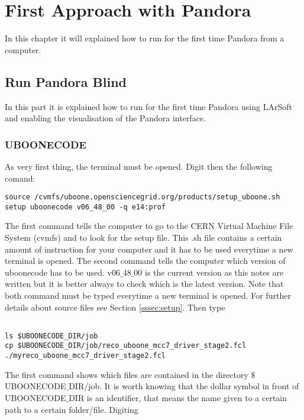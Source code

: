 	\chapter{First Approach with Pandora}

In this chapter it will explained how to run for the first time Pandora from a computer.

	\section{Run Pandora Blind} \label{sssec:pandora_blind}

In this part it is explained how to run for the first time Pandora using LArSoft and enabling the visualisation of the Pandora interface.  

\subsection{UBOONECODE}  \label{sssec:uboonecode}
As very first thing, the terminal must be opened. Digit then the following comand:

\begin{verbatim}
source /cvmfs/uboone.opensciencegrid.org/products/setup_uboone.sh
setup uboonecode v06_48_00 -q e14:prof
\end{verbatim}

The first command tells the computer to go to the CERN Virtual Machine File System (cvmfs) and to look for the setup file. This .sh file contains a certain amount of instruction for your computer and it has to be used everytime a new terminal is opened. The second command tells the computer which version of uboonecode has to be used. v06${\_}$48${\_}$00 is the current version as this notes are written but it is better always to check which is the latest version. Note that both command must be typed everytime a new terminal is opened. For further details about source files see Section \ref{sssec:setup}. Then type 

\begin{verbatim}

ls $UBOONECODE_DIR/job
cp $UBOONECODE_DIR/job/reco_uboone_mcc7_driver_stage2.fcl ./myreco_uboone_mcc7_driver_stage2.fcl

\end{verbatim}

The first command shows which files are contained in the directory ${\$}$UBOONECODE${\_}$DIR/job. It is worth knowing that the dollar symbol in front of UBOONECODE${\_}$DIR is an identifier, that means the name given to a certain path to a certain folder/file. Digiting

